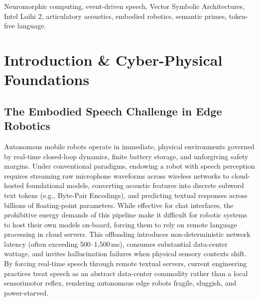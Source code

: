 \documentclass[journal,twocolumn]{IEEEtran}
\begin{document}
\begin{abstract}
When deployed within the Intel Lava Neuromorphic Framework simulating Intel Loihi 2 spiking silicon under asynchronous virtual time-stepping, our architecture demonstrates: (1) \textbf{Zero-Power Quiescence}, rejecting ambient room noise up to $I = 4.8$ with 0 false-alarm spikes across 180 neuron-steps while synchronously latching 6-bit Address-Event Representation (AER) coordinate bursts; (2) \textbf{Clockless Syllable Pacing}, using acoustic Bit-0 transitions to pace cadence and separate staccato commands from soothing speech with a $>3\times$ warmth ratio without CPU timer interrupts; and (3) \textbf{Continuous Spiking Attractors}, where a 10-compartment competitive network heals 1-bit corrupted acoustic inputs into correct semantic basins with zero competitor leakage across an 18.8\% safety barrier. Operating at $1\text{--}2\,\mu\text{J}$ per semantic decision, representing a one-million-fold ($10^6\times$) energy reduction over cloud LLMs, this architecture solves the core latency and power bottleneck by enabling autonomous robots to bypass arbitrary symbolic translation, interpreting the physical concepts inherent in speech acoustics directly for immediate, low-power cyber-physical attunement.
\end{abstract}

\begin{IEEEkeywords}
Neuromorphic computing, event-driven speech, Vector Symbolic Architectures, Intel Loihi 2, articulatory acoustics, embodied robotics, semantic primes, token-free language.
\end{IEEEkeywords}

\section{Introduction \& Cyber-Physical Foundations}

\subsection{The Embodied Speech Challenge in Edge Robotics}
Autonomous mobile robots operate in immediate, physical environments governed by real-time closed-loop dynamics, finite battery storage, and unforgiving safety margins. Under conventional paradigms, endowing a robot with speech perception requires streaming raw microphone waveforms across wireless networks to cloud-hosted foundational models, converting acoustic features into discrete subword text tokens (e.g., Byte-Pair Encodings), and predicting textual responses across billions of floating-point parameters. While effective for chat interfaces, the prohibitive energy demands of this pipeline make it difficult for robotic systems to host their own models on-board, forcing them to rely on remote language processing in cloud servers. This offloading introduces non-deterministic network latency (often exceeding 500--1,500\,ms), consumes substantial data-center wattage, and invites hallucination failures when physical sensory contexts shift. By forcing real-time speech through remote textual servers, current engineering practices treat speech as an abstract data-center commodity rather than a local sensorimotor reflex, rendering autonomous edge robots fragile, sluggish, and power-starved.
\end{document}

